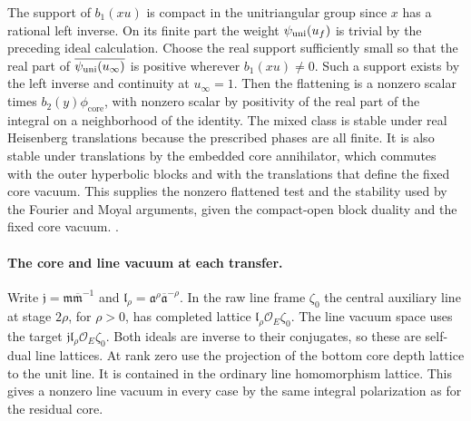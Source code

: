 The support of \(b_1(xu)\) is compact in the
unitriangular group since \(x\) has a rational left inverse.
On its finite part the weight \(\psi_{\rm uni}(u_f)\)
is trivial by the preceding ideal calculation.
Choose the real support sufficiently small so that the
real part of \(\overline{\psi_{\rm uni}(u_\infty)}\)
is positive wherever \(b_1(xu)\ne0\). Such a support
exists by the left inverse and continuity at \(u_\infty=1\).
Then the flattening is a nonzero scalar times
\(b_2(y)\phi_{\mathrm{core}}\), with nonzero scalar by positivity of
the real part of the integral on a neighborhood of
the identity. The mixed class is stable under real
Heisenberg translations because the prescribed phases
are all finite. It is also stable under translations by
the embedded core annihilator, which commutes with
the outer hyperbolic blocks and with the translations
that define the fixed core vacuum. This supplies the nonzero
flattened test and the stability used by the Fourier
and Moyal arguments, given the compact-open block
duality and the fixed core vacuum.
.

\paragraph{The core and line vacuum at each transfer.}
Write \(\mathfrak j=\mathfrak m\overline{\mathfrak m}^{-1}\)
and \(\mathfrak l_\rho
=\mathfrak a^\rho\overline{\mathfrak a}^{-\rho}\).
In the raw line frame \(\zeta_0\) the central auxiliary
line at stage \(2\rho\), for \(\rho>0\), has completed
lattice \(\mathfrak l_\rho\mathcal O_E\zeta_0\).
The line vacuum space uses the target
\(\mathfrak j\mathfrak l_\rho\mathcal O_E\zeta_0\).
Both ideals are inverse to their conjugates, so
these are self-dual line lattices. At rank zero use
the projection of the bottom core depth lattice to the
unit line. It is contained in the ordinary line
homomorphism lattice. This gives a nonzero line vacuum
in every case by the same integral polarization as
for the residual core.

